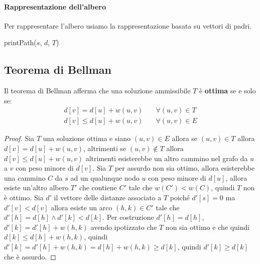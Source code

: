     \paragraph{Rappresentazione dell'albero}
        Per rappresentare l'albero usiamo la rappresentazione basata su vettori di padri.
        \begin{algorithm}[H]
            \caption{printPath(\Node $s$, \Node $d$, \Node[] $T$)}
            \begin{algorithmic}
                    \State {}
                    \State {}
                \Else
                    \State {}
                    \State {}
                \EndIf
            \end{algorithmic}
        \end{algorithm}
    \subsection{Teorema di Bellman}
        Il teorema di Bellman afferma che una soluzione ammissibile $T$ è \textbf{ottima} se e solo se:
        \begin{align*}
            d[v]=d[u]+w(u,v) \quad& \forall (u,v) \in T\\
            d[v]\leq d[u]+w(u,v) \quad& \forall (u,v) \in E
        \end{align*}
        \begin{proof}
            Sia $T$ una soluzione ottima e siano $(u,v)\in E$ allora se $(u,v)\in T$ allora $d[v]=d[u]+w(u,v)$, altrimenti se $(u,v)\not\in T$ allora $d[v]\leq d[u]+w(u,v)$ altrimenti esisterebbe un altro cammino nel grafo da $u$ a $v$ con peso minore di $d[v]$.\newline
            Sia $T$ per assurdo non sia ottimo, allora esisterebbe una cammino $C$ da $s$ ad un qualunque nodo $u$ con peso minore di $d[u]$, allora esiste un'altro albero $T'$ che contiene $C'$ tale che $w(C')<w(C)$, quindi $T$ non è ottimo.
            Sia $d'$ il vettore delle distanze associato a $T$ poiché $d'[s]=0$ ma $d'[v]<d[v]$ allora esiste un arco $(h,k)\in C'$ tale che $d'[h]=d[h] \land d'[k]<d[k]$. Per costruzione $d'[h]=d[h]$, $d'[k]=d'[h]+w(h,k)$ avendo ipotizzato che $T$ non sia ottimo e che quindi $d[k]\leq d[h]+w(h,k)$, quindi $d'[k]=d'[h]+w(h,k) = d[h]+w(h,k) \geq d[k]$, quindi $d'[k]\geq d[k]$ che è assurdo.
        \end{proof}
